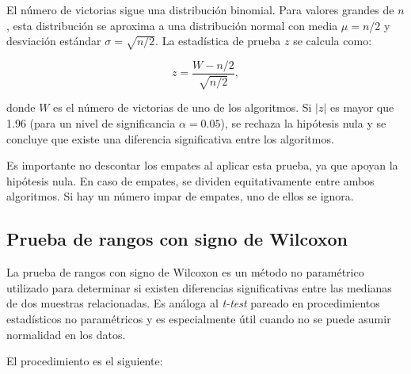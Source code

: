 El número de victorias sigue una distribución binomial. Para valores grandes de $n$, esta distribución se aproxima a una distribución normal con media $\mu = n/2$ y desviación estándar $\sigma = \sqrt{n/2}$. La estadística de prueba $z$ se calcula como:

\[
z = \frac{W - n/2}{\sqrt{n/2}},
\]

donde $W$ es el número de victorias de uno de los algoritmos. Si $|z|$ es mayor que 1.96 (para un nivel de significancia $\alpha = 0.05$), se rechaza la hipótesis nula y se concluye que existe una diferencia significativa entre los algoritmos.

Es importante no descontar los empates al aplicar esta prueba, ya que apoyan la hipótesis nula. En caso de empates, se dividen equitativamente entre ambos algoritmos. Si hay un número impar de empates, uno de ellos se ignora.

\subsection{Prueba de rangos con signo de Wilcoxon}
\label{sec:prueba_wilcoxon}

La prueba de rangos con signo de Wilcoxon es un método no paramétrico utilizado para determinar si existen diferencias significativas entre las medianas de dos muestras relacionadas. Es análoga al \textit{t-test} pareado en procedimientos estadísticos no paramétricos y es especialmente útil cuando no se puede asumir normalidad en los datos.

El procedimiento es el siguiente:

